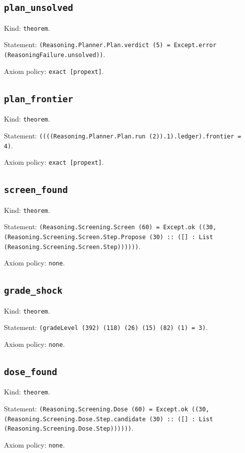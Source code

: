 \documentclass[11pt]{article}
\begin{document}
\subsection*{\texttt{plan\_unsolved}}
\noindent Kind: \texttt{theorem}.\par
\noindent Statement: \texttt{(Reasoning.Planner.Plan.verdict (5) = Except.error (ReasoningFailure.unsolved))}.\par
\noindent Axiom policy: \texttt{exact [propext]}.\par
\subsection*{\texttt{plan\_frontier}}
\noindent Kind: \texttt{theorem}.\par
\noindent Statement: \texttt{((((Reasoning.Planner.Plan.run (2)).1).ledger).frontier = 4)}.\par
\noindent Axiom policy: \texttt{exact [propext]}.\par
\subsection*{\texttt{screen\_found}}
\noindent Kind: \texttt{theorem}.\par
\noindent Statement: \texttt{(Reasoning.Screening.Screen (60) = Except.ok ((30, (Reasoning.Screening.Screen.Step.Propose (30) :: ([] : List (Reasoning.Screening.Screen.Step))))))}.\par
\noindent Axiom policy: \texttt{none}.\par
\subsection*{\texttt{grade\_shock}}
\noindent Kind: \texttt{theorem}.\par
\noindent Statement: \texttt{(gradeLevel (392) (118) (26) (15) (82) (1) = 3)}.\par
\noindent Axiom policy: \texttt{none}.\par
\subsection*{\texttt{dose\_found}}
\noindent Kind: \texttt{theorem}.\par
\noindent Statement: \texttt{(Reasoning.Screening.Dose (60) = Except.ok ((30, (Reasoning.Screening.Dose.Step.candidate (30) :: ([] : List (Reasoning.Screening.Dose.Step))))))}.\par
\noindent Axiom policy: \texttt{none}.\par
\end{document}
